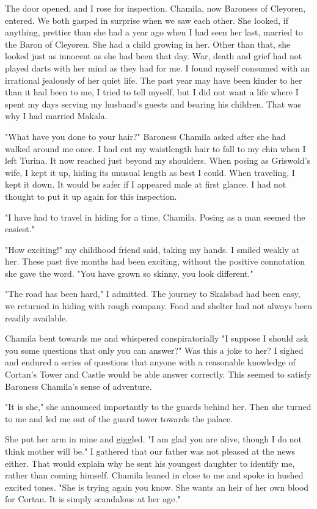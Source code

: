 \documentclass{article}
\begin{document}
The door opened, and I rose for inspection. Chamila, now Baroness of Cleyoren, entered. We both gasped in surprise when we saw each other. She looked, if anything, prettier than she had a year ago when I had seen her last, married to the Baron of Cleyoren. She had a child growing in her. Other than that, she looked just as innocent as she had been that day. War, death and grief had not played darts with her mind as they had for me. I found myself consumed with an irrational jealously of her quiet life. The past year may have been kinder to her than it had been to me, I tried to tell myself, but I did not want a life where I spent my days serving my husband's guests and bearing his children. That was why I had married Makala.

"What have you done to your hair?" Baroness Chamila asked after she had walked around me once. I had cut my waistlength hair to fall to my chin when I left Turina. It now reached just beyond my shoulders. When posing as Griswold's wife, I kept it up, hiding its unusual length as best I could. When traveling, I kept it down. It would be safer if I appeared male at first glance. I had not thought to put it up again for this inspection.

"I have had to travel in hiding for a time, Chamila. Posing as a man seemed the easiest."

"How exciting!" my childhood friend said, taking my hands. I smiled weakly at her. These past five months had been exciting, without the positive connotation she gave the word. "You have grown so skinny, you look different."

"The road has been hard," I admitted. The journey to Skalsbad had been easy, we returned in hiding with rough company. Food and shelter had not always been readily available. 

Chamila bent towards me and whispered conspiratorially "I suppose I should ask you some questions that only you can answer?"  Was this a joke to her? I sighed and endured a series of questions that anyone with a reasonable knowledge of Cortan's Tower and Castle would be able answer correctly. This seemed to satisfy Baroness Chamila's sense of adventure.

"It is she," she announced importantly to the guards behind her. Then she turned to me and led me out of the guard tower towards the palace. 

She put her arm in mine and giggled. "I am glad you are alive, though I do not think mother will be." I gathered that our father was not pleased at the news either. That would explain why he sent his youngest daughter to identify me, rather than coming himself. Chamila leaned in close to me and spoke in hushed excited tones. "She is trying again you know. She wants an heir of her own blood for Cortan. It is simply scandalous at her age." 
\end{document}
